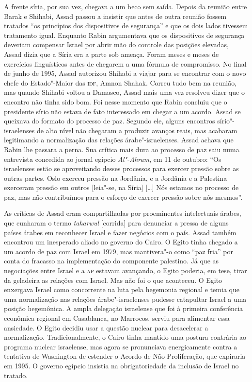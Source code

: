 A frente síria, por sua vez, chegava a um beco sem saída. Depois da
reunião entre Barak e Shihabi, Assad passou a insistir que antes de outra
reunião fossem tratados ``os princípios dos dispositivos de segurança''
e que os dois lados tivessem tratamento igual. Enquanto Rabin
argumentava que os dispositivos de segurança deveriam compensar Israel
por abrir mão do controle das posições elevadas, Assad dizia que a Síria
era a parte sob ameaça. Foram meses e meses de exercícios linguísticos
antes de chegarem a uma fórmula de compromisso. No final de junho de
1995, Assad autorizou Shihabi a viajar para se encontrar com o novo chefe
do Estado"-Maior das \textsc{idf}, Amnon Shahak. Correu tudo bem na reunião, mas
quando Shihabi voltou a Damasco, Assad mais uma vez resolveu dizer que o
encontro não tinha sido bom. Foi nesse momento que Rabin concluiu que o
presidente sírio não estava de fato interessado em chegar a um acordo.
Assad se queixava do formato do processo de paz. Segundo ele, alguns
encontros sírio"-israelenses de alto nível não chegaram a produzir
avanços reais, mas acabaram legitimando a normalização das relações
árabe"-israelenses. Assad achava que Rabin lhe passara a perna. Sua
crítica mais dura ao processo de paz saiu numa entrevista concedida ao
jornal egípcio \emph{Al"-Ahram}, em 11 de outubro: ``Os israelenses estão
se aproveitando desses processos para exercer pressão sobre as outras
partes. Oslo exerceu pressão na Jordânia, e a Jordânia e a Palestina
exerceram pressão em outros {[}leia"-se, na Síria{]} {[}\ldots{}{]} Nós estamos no
processo de paz, mas não contribuímos para o esforço de exercer pressão
sobre nós mesmos''.

As críticas de Assad eram compartilhadas por proeminentes intelectuais
árabes, que cunharam o termo \emph{taharwul} {[}corrida{]} para
denunciar a pressa de alguns países árabes em reconhecer Israel e fazer
negócios com o país. Assad também encontrou um inesperado aliado no
governo do Cairo. O Egito tinha chegado a um acordo de paz com Israel em
1979, mas mantivera"-o como ``paz fria'' por conta do fracasso na
implementação do componente palestino. Já que as negociações entre
Israel e a \textsc{ap} estavam avançando, o Egito poderia, em tese, tirar da
geladeira as relações com Israel. Mas não foi o que aconteceu. O Egito
enxergava Israel como concorrente na luta pela hegemonia regional e
temia que uma normalização nas relações árabe"-israelenses pudesse
catapultar Israel a uma posição hegemônica. A ampla delegação israelense
que foi à primeira conferência econômica regional em Casablanca, no
Marrocos, serviu para alimentar essa ansiedade. O Egito decidiu usar a
questão nuclear para desacelerar a normalização. Tradicionalmente, o
Cairo tinha mantido uma postura contrária ao programa nuclear israelense, mas agora
se pronunciava energicamente contra a tentativa de Washington de
estender o Acordo de Não Proliferação, que expiraria em 1995. O governo
egípcio insistia na obrigatoriedade da inclusão de Israel no tratado.


